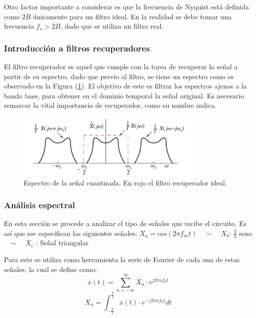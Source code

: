 Otro factor importante a considerar es que la frecuencia de Nyquist está definida como $2B$ únicamente para un filtro ideal. En la realidad se debe tomar una frecuencia $f_s>2B$, dado que se utiliza un filtro real.


\subsubsection{Introducción a filtros recuperadores}
El filtro recuperador es aquel que cumple con la tarea de recuperar la señal a partir de su espectro, dado que previo al filtro, se tiene un espectro como es observado en la Figura (\ref{fig:recuperador}). El objetivo de este es filtrar los espectros ajenos a la banda base, para obtener en el dominio temporal la señal original. Es necesario remarcar la vital importancia de recuperador, como su nombre indica.
\begin{figure}[H]
	\centering
	\includegraphics[width=0.8\textwidth]{ImagenesEjercicio2/recuperador.PNG}
\caption{Espectro de la señal cuantizada. En rojo el filtro recuperador ideal.}
	\label{fig:recuperador}
\end{figure}

\subsubsection{Análisis espectral}
En esta sección se procede a analizar el tipo de señales que recibe el circuito. Es así que see especifican las siguientes señales:
{\center
$X_a = cos(2 \pi f_{in} t)$ \ \ $\sim$  \ \
$X_b$: $\frac{3}{2}$ seno \  \ $\sim$ \ \
$X_c$ : Señal triangular \\
}

Para esto se utiliza como herramienta la serie de Fourier de cada una de estas señales, la cual se define como:
\begin{equation*}
x(t) = \sum_{n=-\infty}^{\infty} X_n \cdot e^{j2\pi n f_0t}
\end{equation*}
\begin{equation*}
X_n= \int_{-\frac{T}{2}}^\frac{T}{2} x(t) \cdot e^{-j2\pi n f_0t} dt
\end{equation*}

